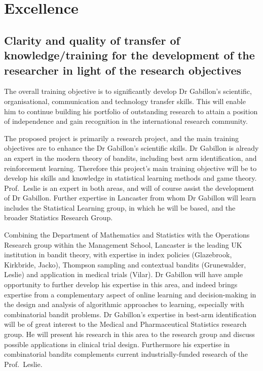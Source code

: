 \documentclass[a4paper,11pt]{article}
\renewcommand{\cite}{\autocite} %
\begin{document}
\newpage

\section{Excellence}
\label{sec:excellence}






\subsection{Clarity and quality of transfer of knowledge/training for the development of the researcher in light of the research objectives}
\label{sec:transfer}


The overall training objective is to significantly develop Dr Gabillon's scientific, organisational, communication and technology transfer skills.  This will enable him to continue building his portfolio of outstanding research to attain a position of independence and gain recognition in the international research community.

The proposed project is primarily a research project, and the main training objectives are to enhance the Dr Gabillon's scientific skills. Dr Gabillon is already an expert in the modern theory of bandits, including best arm identification, and reinforcement learning.  Therefore this project's main training objective will be to develop his skills and knowledge in statistical learning methods and game theory.  Prof.\ Leslie is an expert in both areas, and will of course assist the development of Dr Gabillon.  Further expertise in Lancaster from whom Dr Gabillon will learn includes the Statistical Learning group, in which he will be based, and the broader Statistics Research Group.

Combining the Department of Mathematics and Statistics with the Operations Research group within the Management School, Lancaster is the leading UK institution in bandit theory, with expertise in index policies (Glazebrook, Kirkbride, Jacko), Thompson sampling and contextual bandits (Grunewalder, Leslie) and application in medical trials (Vilar). Dr Gabillon will have ample opportunity to further develop his expertise in this area, and indeed brings expertise from a complementary aspect of online learning and decision-making in the design and analysis of algorithmic approaches to learning, especially with combinatorial bandit problems.   Dr Gabillon's expertise in best-arm identification will be of great interest to the Medical and Pharmaceutical Statistics research group.  He will present his research in this area to the research group and discuss possible applications in clinical trial design.  Furthermore his expertise in combinatorial bandits complements current industrially-funded research of the Prof.\ Leslie.
\end{document}
